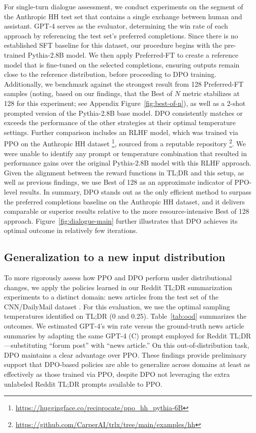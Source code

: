 For single-turn dialogue assessment, we conduct experiments on the segment of the Anthropic HH test set \citep{bai2022training} that contains a single exchange between human and assistant. GPT-4 serves as the evaluator, determining the win rate of each approach by referencing the test set's preferred completions. Since there is no established SFT baseline for this dataset, our procedure begins with the pre-trained Pythia-2.8B model. We then apply Preferred-FT to create a reference model that is fine-tuned on the selected completions, ensuring outputs remain close to the reference distribution, before proceeding to DPO training. Additionally, we benchmark against the strongest result from 128 Preferred-FT samples (noting, based on our findings, that the Best of $N$ metric stabilizes at 128 for this experiment; see Appendix Figure~\ref{fig:best-of-n}), as well as a 2-shot prompted version of the Pythia-2.8B base model. DPO consistently matches or exceeds the performance of the other strategies at their optimal temperature settings. Further comparison includes an RLHF model, which was trained via PPO on the Anthropic HH dataset \footnote{\url{https://huggingface.co/reciprocate/ppo_hh_pythia-6B}}, sourced from a reputable repository \footnote{\url{https://github.com/CarperAI/trlx/tree/main/examples/hh}}. We were unable to identify any prompt or temperature combination that resulted in performance gains over the original Pythia-2.8B model with this RLHF approach. Given the alignment between the reward functions in TL;DR and this setup, as well as previous findings, we use Best of 128 as an approximate indicator of PPO-level results. In summary, DPO stands out as the only efficient method to surpass the preferred completions baseline on the Anthropic HH dataset, and it delivers comparable or superior results relative to the more resource-intensive Best of 128 approach. Figure~\ref{fig:dialogue-main} further illustrates that DPO achieves its optimal outcome in relatively few iterations.

\subsection{Generalization to a new input distribution}

To more rigorously assess how PPO and DPO perform under distributional changes, we apply the policies learned in our Reddit TL;DR summarization experiments to a distinct domain: news articles from the test set of the CNN/DailyMail dataset \citep{nallapati-etal-2016-abstractive}. For this evaluation, we use the optimal sampling temperatures identified on TL;DR (0 and 0.25). Table~\ref{tab:ood} summarizes the outcomes. We estimated GPT-4’s win rate versus the ground-truth news article summaries by adapting the same GPT-4 (C) prompt employed for Reddit TL;DR—substituting “forum post” with “news article.” On this out-of-distribution task, DPO maintains a clear advantage over PPO. These findings provide preliminary support that DPO-based policies are able to generalize across domains at least as effectively as those trained via PPO, despite DPO not leveraging the extra unlabeled Reddit TL;DR prompts available to PPO.


